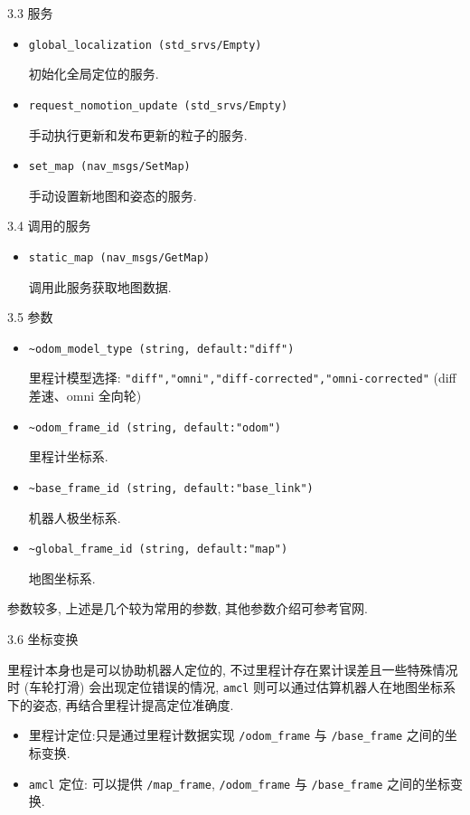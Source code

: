 \documentclass[openany, fontset=windowsold]{ctexbook}
\theoremstyle{kaiti}
\theoremstyle{normal}
\begin{document}
3.3 服务

\begin{itemize}
  \item \verb|global_localization (std_srvs/Empty)|

  初始化全局定位的服务.

  \item \verb|request_nomotion_update (std_srvs/Empty)|

  手动执行更新和发布更新的粒子的服务.

  \item \verb|set_map (nav_msgs/SetMap)|

  手动设置新地图和姿态的服务.
\end{itemize}

3.4 调用的服务

\begin{itemize}
  \item \verb|static_map (nav_msgs/GetMap)|

  调用此服务获取地图数据.
\end{itemize}

3.5 参数

\begin{itemize}
  \item \verb|~odom_model_type (string, default:"diff")|

  里程计模型选择: \verb|"diff","omni","diff-corrected","omni-corrected"| (diff 差速、omni 全向轮)

  \item \verb|~odom_frame_id (string, default:"odom")|

  里程计坐标系.

  \item \verb|~base_frame_id (string, default:"base_link")|

  机器人极坐标系.

  \item \verb|~global_frame_id (string, default:"map")|

  地图坐标系.
\end{itemize}

参数较多, 上述是几个较为常用的参数, 其他参数介绍可参考官网.

3.6 坐标变换

里程计本身也是可以协助机器人定位的, 不过里程计存在累计误差且一些特殊情况时 (车轮打滑) 会出现定位错误的情况, \verb|amcl| 则可以通过估算机器人在地图坐标系下的姿态, 再结合里程计提高定位准确度.

\begin{itemize}
  \item 里程计定位:只是通过里程计数据实现 \verb|/odom_frame| 与 \verb|/base_frame| 之间的坐标变换.
  \item \verb|amcl| 定位: 可以提供 \verb|/map_frame|, \verb|/odom_frame| 与 \verb|/base_frame| 之间的坐标变换.
\end{itemize}
\end{document}
